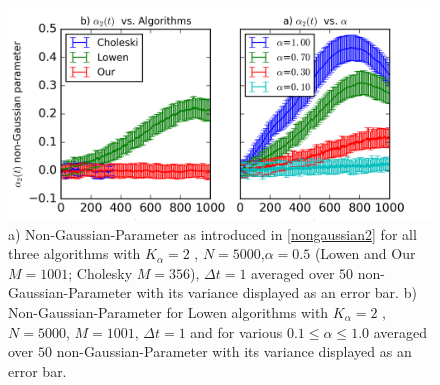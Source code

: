 \documentclass[
  a4paper,BCOR10mm,oneside,
  headsepline,footsepline,%
  fleqn,openbib
]{scrbook}
\begin{document}
 

\begin{figure}[h!]
\centering
\includegraphics[width=\textwidth]{./data/nongaussianlowenalpha.png}
\caption{a) Non-Gaussian-Parameter as introduced in \cref{nongaussian2} for all three algorithms with $K_{\alpha}=2$ , $N=5000$,$\alpha=0.5$ (Lowen and Our $M=1001$; Cholesky $M=356$), $\Delta t = 1$  averaged over $50$ non-Gaussian-Parameter with its variance displayed as an error bar.\newline
b) Non-Gaussian-Parameter for Lowen algorithms with $K_{\alpha}=2$ , $N=5000$, $M=1001$, $\Delta t = 1$ and for various $0.1\leq\alpha\leq1.0$  averaged over $50$ non-Gaussian-Parameter with its variance displayed as an error bar.}
\label{nongaussianlowen}
\end{figure}
\end{document}
